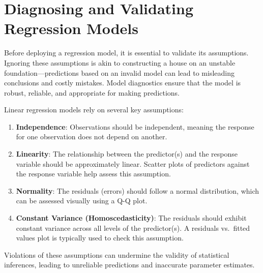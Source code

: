 \documentclass[
]{book}
\providecommand{\tightlist}{%
  \setlength{\itemsep}{0pt}\setlength{\parskip}{0pt}}
\theoremstyle{definition}
\theoremstyle{definition}
\theoremstyle{definition}
\theoremstyle{definition}
\theoremstyle{remark}
\begin{document}
\section{Diagnosing and Validating Regression Models}\label{diagnosing-and-validating-regression-models}

Before deploying a regression model, it is essential to validate its assumptions. Ignoring these assumptions is akin to constructing a house on an unstable foundation---predictions based on an invalid model can lead to misleading conclusions and costly mistakes. Model diagnostics ensure that the model is robust, reliable, and appropriate for making predictions.

Linear regression models rely on several key assumptions:

\begin{enumerate}
\def\labelenumi{\arabic{enumi}.}
\tightlist
\item
  \textbf{Independence}: Observations should be independent, meaning the response for one observation does not depend on another.\\
\item
  \textbf{Linearity}: The relationship between the predictor(s) and the response variable should be approximately linear. Scatter plots of predictors against the response variable help assess this assumption.\\
\item
  \textbf{Normality}: The residuals (errors) should follow a normal distribution, which can be assessed visually using a Q-Q plot.\\
\item
  \textbf{Constant Variance (Homoscedasticity)}: The residuals should exhibit constant variance across all levels of the predictor(s). A residuals vs.~fitted values plot is typically used to check this assumption.
\end{enumerate}

Violations of these assumptions can undermine the validity of statistical inferences, leading to unreliable predictions and inaccurate parameter estimates.
\end{document}
